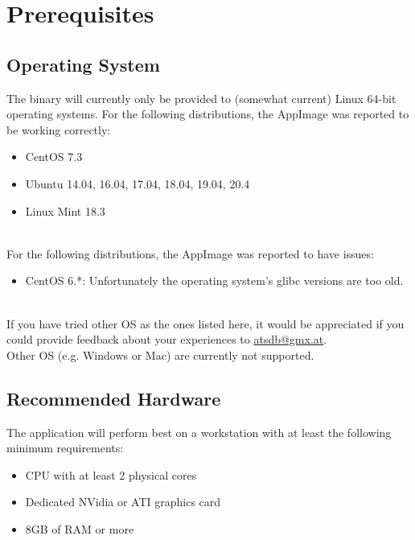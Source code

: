 \section{Prerequisites}

\subsection{Operating System}

The binary will currently only be provided to (somewhat current) Linux 64-bit operating systems. For the following distributions, the AppImage was reported to be working correctly:

\begin{itemize}  
\item CentOS 7.3
\item Ubuntu 14.04, 16.04, 17.04, 18.04, 19.04, 20.4
\item Linux Mint 18.3
\end{itemize}
\ \\

For the following distributions, the AppImage was reported to have issues:

\begin{itemize}  
\item CentOS 6.*: Unfortunately the operating system's glibc versions are too old.
\end{itemize}
\ \\

If you have tried other OS as the ones listed here, it would be appreciated if you could provide feedback about your experiences to \href{mailto:atsdb@gmx.at}{atsdb@gmx.at}.\\

Other OS (e.g. Windows or Mac) are currently not supported.

\subsection{Recommended Hardware}

The application will perform best on a workstation with at least the following minimum requirements:

\begin{itemize}  
\item CPU with at least 2 physical cores
\item Dedicated NVidia or ATI graphics card
\item 8GB of RAM or more
\end{itemize}
\ \\

